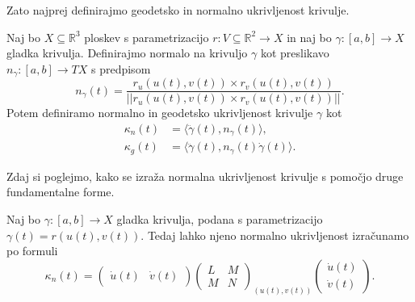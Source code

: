 Zato najprej definirajmo geodetsko in normalno ukrivljenost krivulje.

\begin{definicija}
\label{def_geodetska_in_normalna_ukrivljenost}
Naj bo $X \subseteq \mathbb{R}^3$ ploskev s parametrizacijo $r: V \subseteq \mathbb{R}^2 \to  X$ in naj bo $\gamma: [a,b] \to X$ gladka krivulja. 
Definirajmo normalo na krivuljo $\gamma$ kot preslikavo $n_{\gamma}: [a,b] \to  TX$ s predpisom
\begin{equation*} n_{\gamma}(t) = \frac{r_u(u(t), v(t)) \times  r_v(u(t), v(t))}{\lvert\lvert r_u(u(t), v(t)) \times  r_v(u(t), v(t)) \rvert\rvert }.\end{equation*}
Potem definiramo normalno in geodetsko ukrivljenost krivulje $\gamma$ kot 
\begin{align*}
    \kappa_n(t) &= \langle \ddot{\gamma}(t), n_{\gamma}(t) \rangle,  \\
    \kappa_g(t) &= \langle \ddot{\gamma}(t),  n_{\gamma}(t)  \dot{\gamma}(t) \rangle.
\end{align*}

\end{definicija}

Zdaj si poglejmo, kako se izraža normalna ukrivljenost krivulje s pomočjo druge fundamentalne forme.

\begin{izrek}
\label{izr_izrazava_normalne_ukrivljenosti_z_drugo_fundamentalno_formo}
  Naj bo $\gamma: [a,b] \to X$ gladka krivulja, podana s parametrizacijo $\gamma(t) = r(u(t), v(t))$. Tedaj lahko njeno normalno ukrivljenost
  izračunamo po formuli 
  \begin{equation*} \kappa_n(t) = \begin{pmatrix}
    \dot{u}(t) & \dot{v}(t) 
  \end{pmatrix}  
  \begin{pmatrix}
    L & M \\
    M & N
  \end{pmatrix}_{(u(t), v(t))}  
  \begin{pmatrix}
    \dot{u}(t) \\
    \dot{v}(t) 
  \end{pmatrix}.  \end{equation*}
\end{izrek}

